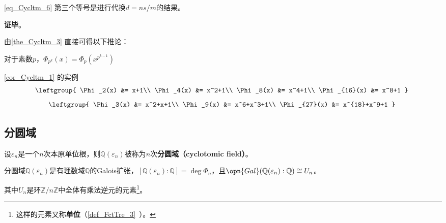 \autoref{eq_Cycltm_6} 第三个等号是进行代换$d=ns/m$的结果。


\textbf{证毕}。








由\autoref{the_Cycltm_3} 直接可得以下推论：

\begin{corollary}{}\label{cor_Cycltm_1}
对于素数$p$，$\Phi_{p^k}(x) = \Phi_p(x^{p^{k-1}})$
\end{corollary}




\begin{example}{\autoref{cor_Cycltm_1}  的实例}
\begin{equation}
\leftgroup{
    \Phi_2(x) &= x+1\\
    \Phi_4(x) &= x^2+1\\
    \Phi_8(x) &= x^4+1\\
    \Phi_{16}(x) &= x^8+1
}~
\end{equation}
\begin{equation}
\leftgroup{
    \Phi_3(x) &= x^2+x+1\\
    \Phi_9(x) &= x^6+x^3+1\\
    \Phi_{27}(x) &= x^{18}+x^9+1
}~
\end{equation}
\end{example}




\subsection{分圆域}

\begin{definition}{}
设$\varepsilon_n$是一个$n$次本原单位根，则$\mathbb{Q}(\varepsilon_n)$被称为$n$次\textbf{分圆域（cyclotomic field）}。
\end{definition}


\begin{theorem}{}
分圆域$\mathbb{Q}(\varepsilon_n)$是有理数域$\mathbb{Q}$的Galois扩张，$[\mathbb{Q}(\varepsilon_n):\mathbb{Q}]=\deg \Phi_n$，且$\opn{Gal}(\mathbb{Q}(\varepsilon_n):\mathbb{Q})\cong U_n$。

其中$U_n$是环$\mathbb{Z}/n\mathbb{Z}$中全体有乘法逆元的元素\footnote{这样的元素又称\textbf{单位}（\autoref{def_FctTre_3}~）。}。
\end{theorem}

